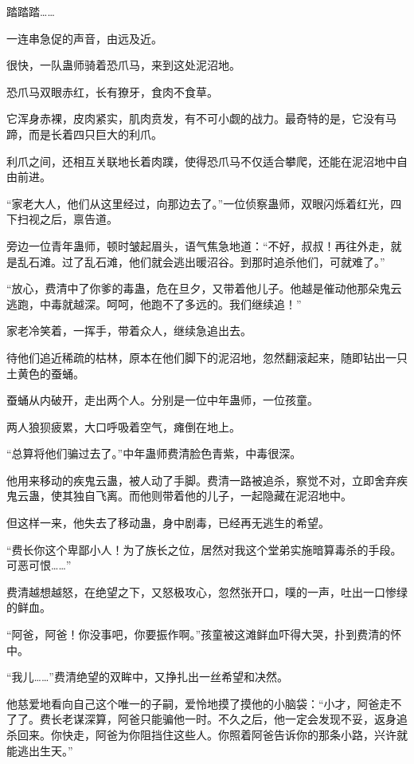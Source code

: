 
\begin{this_body}



踏踏踏……

一连串急促的声音，由远及近。

很快，一队蛊师骑着恐爪马，来到这处泥沼地。

恐爪马双眼赤红，长有獠牙，食肉不食草。

它浑身赤裸，皮肉紧实，肌肉贲发，有不可小觑的战力。最奇特的是，它没有马蹄，而是长着四只巨大的利爪。

利爪之间，还相互关联地长着肉蹼，使得恐爪马不仅适合攀爬，还能在泥沼地中自由前进。

“家老大人，他们从这里经过，向那边去了。”一位侦察蛊师，双眼闪烁着红光，四下扫视之后，禀告道。

旁边一位青年蛊师，顿时皱起眉头，语气焦急地道：“不好，叔叔！再往外走，就是乱石滩。过了乱石滩，他们就会逃出暖沼谷。到那时追杀他们，可就难了。”

“放心，费清中了你爹的毒蛊，危在旦夕，又带着他儿子。他越是催动他那朵鬼云逃跑，中毒就越深。呵呵，他跑不了多远的。我们继续追！”

家老冷笑着，一挥手，带着众人，继续急追出去。

待他们追近稀疏的枯林，原本在他们脚下的泥沼地，忽然翻滚起来，随即钻出一只土黄色的蚕蛹。

蚕蛹从内破开，走出两个人。分别是一位中年蛊师，一位孩童。

两人狼狈疲累，大口呼吸着空气，瘫倒在地上。

“总算将他们骗过去了。”中年蛊师费清脸色青紫，中毒很深。

他用来移动的疾鬼云蛊，被人动了手脚。费清一路被追杀，察觉不对，立即舍弃疾鬼云蛊，使其独自飞离。而他则带着他的儿子，一起隐藏在泥沼地中。

但这样一来，他失去了移动蛊，身中剧毒，已经再无逃生的希望。

“费长你这个卑鄙小人！为了族长之位，居然对我这个堂弟实施暗算毒杀的手段。可恶可恨……”

费清越想越怒，在绝望之下，又怒极攻心，忽然张开口，噗的一声，吐出一口惨绿的鲜血。

“阿爸，阿爸！你没事吧，你要振作啊。”孩童被这滩鲜血吓得大哭，扑到费清的怀中。

“我儿……”费清绝望的双眸中，又挣扎出一丝希望和决然。

他慈爱地看向自己这个唯一的子嗣，爱怜地摸了摸他的小脑袋：“小才，阿爸走不了了。费长老谋深算，阿爸只能骗他一时。不久之后，他一定会发现不妥，返身追杀回来。你快走，阿爸为你阻挡住这些人。你照着阿爸告诉你的那条小路，兴许就能逃出生天。”


\end{this_body}

